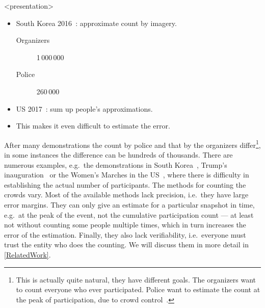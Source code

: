 \begin{frame}<presentation>
  \begin{example}
    \begin{itemize}
      \item South Korea 2016~\cite{2016DemonstrationsInSeoul}:
        approximate count by imagery.
        \begin{description}
          \item[Organizers] 1\,000\,000
          \item[Police] 260\,000
        \end{description}

        \pause

      \item US 2017~\cite{2017WomensMarchesInUS}:
        sum up people's approximations.
      \item This makes it even difficult to estimate the error.
    \end{itemize}
  \end{example}
\end{frame}

After many demonstrations the count by police and that by the organizers 
differ\footnote{%
  This is actually quite natural, they have different goals.
  The organizers want to count everyone who ever participated.
  Police want to estimate the count at the peak of participation, due to crowd 
  control~\cite{2016DemonstrationsInSeoul}.
}, in some instances the difference can be hundreds of thousands.
There are numerous examples, e.g.\ the demonstrations in South 
Korea~\cite{2016DemonstrationsInSeoul}, Trump's 
inauguration~\cite{HowWillWeKnowTrumpInauguralCrowdSize} or the Women's Marches 
in the US~\cite{2017WomensMarchesInUS}, where there is difficulty in 
establishing the actual number of participants.
The methods for counting the crowds vary.
Most of the available methods lack precision, i.e.\ they have large error 
margins.
They can only give an estimate for a particular snapshot in time, e.g.\ at the 
peak of the event, not the cumulative participation count --- at least not 
without counting some people multiple times, which in turn increases the error 
of the estimation.
Finally, they also lack verifiability, i.e.\ everyone must trust the entity who
does the counting.
We will discuss them in more detail in \cref{RelatedWork}.

